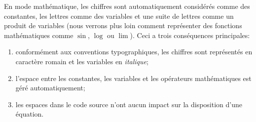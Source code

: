 En mode mathématique, les chiffres sont automatiquement considérés
comme des constantes, les lettres comme des variables et une suite de
lettres comme un produit de variables (nous verrons plus loin comment
représenter des fonctions mathématiques comme $\sin$, $\log$ ou
$\lim$). Ceci a trois conséquences principales:
\begin{enumerate}
\item conformément aux conventions typographiques, les chiffres sont
  représentés en caractère \textrm{romain} et les variables en
  \emph{italique};
\item l'espace entre les constantes, les variables et les opérateurs
  mathématiques est géré automatiquement;
\item les espaces dans le code source n'ont aucun impact sur la
  disposition d'une équation.
\end{enumerate}


